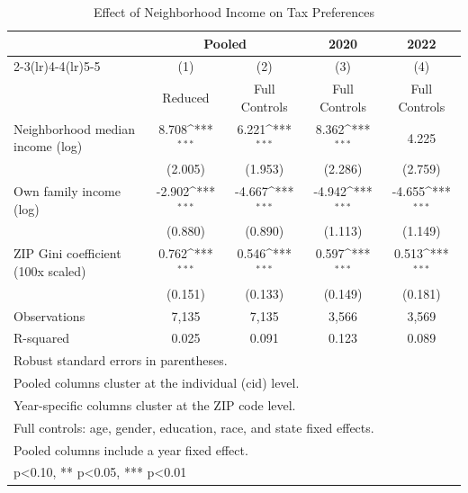 \begin{table}[htbp]\centering
\def\sym#1{\ifmmode^{#1}\else\(^{#1}\)\fi}
\caption{Effect of Neighborhood Income on Tax Preferences}
\begin{tabular}{l*{4}{c}}
\toprule
            &\multicolumn{2}{c}{Pooled}                 &\multicolumn{1}{c}{2020}&\multicolumn{1}{c}{2022}\\\cmidrule(lr){2-3}\cmidrule(lr){4-4}\cmidrule(lr){5-5}
            &\multicolumn{1}{c}{(1)}&\multicolumn{1}{c}{(2)}&\multicolumn{1}{c}{(3)}&\multicolumn{1}{c}{(4)}\\
            &\multicolumn{1}{c}{Reduced}&\multicolumn{1}{c}{Full Controls}&\multicolumn{1}{c}{Full Controls}&\multicolumn{1}{c}{Full Controls}\\
\midrule
Neighborhood median income (log)&       8.708\sym{***}&       6.221\sym{***}&       8.362\sym{***}&       4.225         \\
            &     (2.005)         &     (1.953)         &     (2.286)         &     (2.759)         \\
Own family income (log)&      -2.902\sym{***}&      -4.667\sym{***}&      -4.942\sym{***}&      -4.655\sym{***}\\
            &     (0.880)         &     (0.890)         &     (1.113)         &     (1.149)         \\
ZIP Gini coefficient (100x scaled)&       0.762\sym{***}&       0.546\sym{***}&       0.597\sym{***}&       0.513\sym{***}\\
            &     (0.151)         &     (0.133)         &     (0.149)         &     (0.181)         \\
\midrule
Observations&       7,135         &       7,135         &       3,566         &       3,569         \\
R-squared   &       0.025         &       0.091         &       0.123         &       0.089         \\
\bottomrule
\multicolumn{5}{l}{\footnotesize Robust standard errors in parentheses.}\\
\multicolumn{5}{l}{\footnotesize Pooled columns cluster at the individual (cid) level.}\\
\multicolumn{5}{l}{\footnotesize Year-specific columns cluster at the ZIP code level.}\\
\multicolumn{5}{l}{\footnotesize Full controls: age, gender, education, race, and state fixed effects.}\\
\multicolumn{5}{l}{\footnotesize Pooled columns include a year fixed effect.}\\
\multicolumn{5}{l}{\footnotesize * p<0.10, ** p<0.05, *** p<0.01}\\
\end{tabular}
\end{table}

